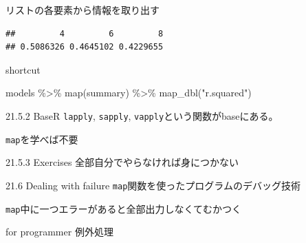 \documentclass[
  ignorenonframetext,
  aspectratio=169]{beamer}
\newenvironment{Shaded}{\begin{snugshade}}{\end{snugshade}}
\newcommand{\FunctionTok}[1]{\textcolor[rgb]{0.00,0.00,0.00}{#1}}
\newcommand{\NormalTok}[1]{#1}
\newcommand{\SpecialCharTok}[1]{\textcolor[rgb]{0.00,0.00,0.00}{#1}}
\newcommand{\StringTok}[1]{\textcolor[rgb]{0.31,0.60,0.02}{#1}}
\begin{document}
\begin{frame}[fragile]{リストの各要素から情報を取り出す}
\protect\hypertarget{ux30eaux30b9ux30c8ux306eux5404ux8981ux7d20ux304bux3089ux60c5ux5831ux3092ux53d6ux308aux51faux3059}{}
\begin{Shaded}
\end{Shaded}

\begin{verbatim}
##         4         6         8 
## 0.5086326 0.4645102 0.4229655
\end{verbatim}

\begin{block}{shortcut}
\protect\hypertarget{shortcut}{}
\begin{Shaded}
\begin{Highlighting}[]
\NormalTok{models }\SpecialCharTok{\%\textgreater{}\%}
  \FunctionTok{map}\NormalTok{(summary) }\SpecialCharTok{\%\textgreater{}\%}
  \FunctionTok{map\_dbl}\NormalTok{(}\StringTok{"r.squared"}\NormalTok{)}
\end{Highlighting}
\end{Shaded}
\end{block}
\end{frame}

\begin{frame}[fragile]{21.5.2 BaseR}
\protect\hypertarget{baser}{}
\texttt{lapply}, \texttt{sapply},
\texttt{vapply}という関数がbaseにある。

\texttt{map}を学べば不要
\end{frame}

\begin{frame}{21.5.3 Exercises}
\protect\hypertarget{exercises-3}{}
全部自分でやらなければ身につかない
\end{frame}

\begin{frame}[fragile]{21.6 Dealing with failure}
\protect\hypertarget{dealing-with-failure}{}
\texttt{map}関数を使ったプログラムのデバッグ技術

\texttt{map}中に一つエラーがあると全部出力しなくてむかつく

\begin{block}{for programmer}
\protect\hypertarget{for-programmer}{}
例外処理
\end{block}
\end{frame}
\end{document}
